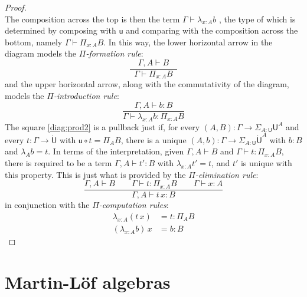 \documentclass[12pt,reqno]{amsart}
\renewcommand{\to}{\ensuremath{\rightarrow}}
\newcommand{\G}{\ensuremath{\Gamma}}
\newcommand{\ext}[2]{{#1,#2}}
\renewcommand{\t}{\ensuremath{\mathsf{u}}}
\newcommand{\T}{\ensuremath{\mathsf{U}}}
\newcommand{\TT}{\ensuremath{\dot{\mathsf{U}}}}
\theoremstyle{remark}
\theoremstyle{definition}
\begin{document}
\begin{proof}
\begin{equation*}
\end{equation*}
The composition across the top is then the term $\G \vdash \lambda_{x:A} b$ , the type of which is determined by composing with $\t$ and comparing with the composition across the bottom, namely $\G \vdash \Pi_{x:A} B$. In this way, the lower horizontal arrow in the diagram models the \emph{$\Pi$-formation rule}:
\[
\frac{\quad\ext{\G}{A}\vdash B\quad}{\G\vdash \Pi_{x:A} B}
\]
and the upper horizontal arrow, along with the commutativity of the diagram, models the \emph{$\Pi$-introduction rule}:
\[
\frac{\ext{\G}{A}\vdash b:B}{\G\vdash \lambda_{x:A} b : \Pi_{x:A} B}
\]
The square \eqref{diag:prod2} is a pullback just if, for every $(A,B) : \G \to \Sigma_{A:\T}\T^A$ and every $t: \G \to \TT$ with $\t \circ t = \Pi_A B$, there is a unique $(A,b) : \G \to \Sigma_{A:\T}\TT^A$ with $b:B$ and $\lambda_A b = t$.  In terms of the interpretation, given $\ext{\G}{A} \vdash B$ and $\G\vdash t: \Pi_{x:A} B$, there is required to be a term $\ext{\G}{A}\vdash t':B$ with $\lambda_{x:A}  t' = t$, and $t'$ is unique with this property.  This is just what is provided by the \emph{$\Pi$-elimination rule}:
\[
\frac{{\ext{\G}{A} \vdash B}\qquad {\G \vdash t : \Pi_{x:A}  B} \qquad {\G \vdash x:A}}{{\ext{\G}{A}\vdash t\, x :B}}
\]
in conjunction with the \emph{$\Pi$-computation rules}:
\begin{align*}
\lambda_{x:A} (t\,x) &= t : \Pi_A B\\
(\lambda_{x:A} b)\,x &= b : B
\end{align*}
\end{proof}


\section{Martin-L\"of algebras}\label{sec:MLalgebras}
\end{document}
